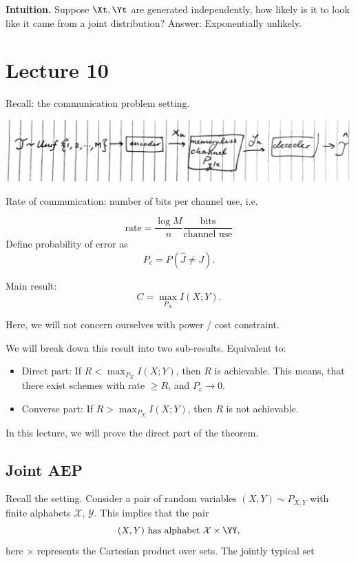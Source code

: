 \documentclass[13pt]{article}
\newcommand{\T}{\text}
\def\XX{\mathcal{X}}
\begin{document}
{\bf Intuition.} Suppose $\Xt, \Yt$ are generated independently, how likely is it to look like it came from a joint distribution?  Answer: Exponentially unlikely.






\section{Lecture 10}

Recall: the communication problem setting.

\includegraphics[width=\textwidth]{img/com.png}

Rate of communication: number of bits per channel use, i.e.

\[
  \T{rate} = \frac{\log M}{n} \frac{\T{bits}}{\T{channel use}}
\]
Define probability of error as
\[
  P_e = P(\hat{J} \neq J).
\]

Main result:
\[
  C = \max_{P_X} I(X; Y).
\]

Here, we will not concern ourselves with power / cost constraint.

We will break down this result into two sub-results. Equivalent to:

\begin{itemize}
  \item Direct part: If $R < \max_{P_X} I(X; Y)$, then $R$ is achievable.  This means, that there exist schemes with rate $\geq R$, and $P_e \to 0$.
  \item Converse part: If $R > \max_{P_X} I(X; Y)$, then $R$ is not achievable.
\end{itemize}

In this lecture, we will prove the direct part of the theorem.

\subsection{Joint AEP}
Recall the setting.  Consider a pair of random variables $(X, Y) \sim P_{X, Y}$ with finite alphabets $\mathcal{X}$, $\mathcal{Y}$.  This implies that the pair
\[
  (X, Y) \text{ has alphabet } \XX \times \YY,
\]
here $\times$ represents the Cartesian product over sets.
The jointly typical set
\end{document}
